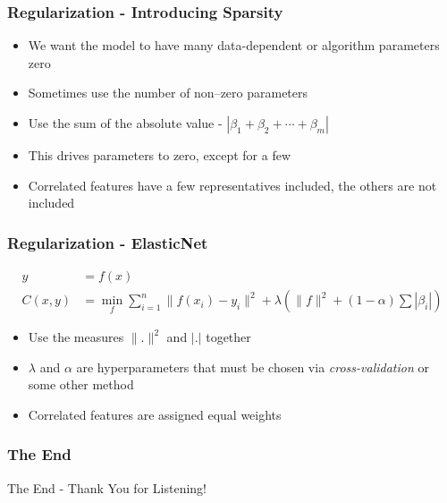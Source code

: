 \documentclass{beamer}
\begin{document}
\begin{frame}
\frametitle{Regularization - Introducing Sparsity}
\begin{itemize}
\item We want the model to have many data-dependent or algorithm parameters zero
\item Sometimes use the number of non--zero parameters
\item Use the sum of the absolute value - $| \beta_1 + \beta_2 + \cdots + \beta_m |$
\item This drives parameters to zero, except for a few
\item Correlated features have a few representatives included, the others are not included
\end{itemize}
\end{frame}

\begin{frame}
\frametitle{Regularization - ElasticNet}
\begin{align}
y &= f(x) \\
C(x, y) &= \min_f \sum_{i=1}^{n} \| f(x_i) - y_i \|^2 + \lambda \left( \| f \|^2 + (1 - \alpha) \sum \left| \beta_i \right| \right)
\end{align}
\begin{itemize}
\item Use the measures $\|. \|^2$ and $|.|$ together
\item $\lambda$ and $\alpha$ are hyperparameters that must be chosen via \textit{cross-validation} or some other method
\item Correlated features are assigned equal weights
\end{itemize}
\end{frame}


\begin{frame}
\frametitle{The End}
\Huge{\centerline{The End - Thank You for Listening!}}
\end{frame}

\end{document}
